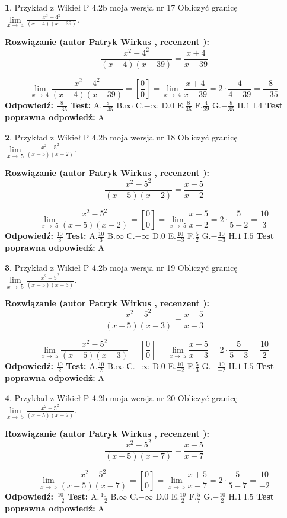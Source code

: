 \documentclass[12pt, a4paper]{article}
\theoremstyle{definition} %
\newtheorem{zad}{}
\newcommand{\zadStart}[1]{\begin{zad}#1\newline}
\newcommand{\zadStop}{\end{zad}}
\newcommand{\rozwStart}[2]{\noindent \textbf{Rozwiązanie (autor #1 , recenzent #2): }\newline}
\newcommand{\rozwStop}{\newline}
\newcommand{\odpStart}{\noindent \textbf{Odpowiedź:}\newline}
\newcommand{\odpStop}{\newline}
\newcommand{\testStart}{\noindent \textbf{Test:}\newline}
\newcommand{\testStop}{\newline}
\newcommand{\kluczStart}{\noindent \textbf{Test poprawna odpowiedź:}\newline}
\newcommand{\kluczStop}{\newline}
\begin{document}
\zadStart{Przykład z Wikieł P 4.2b moja wersja nr 17}
Obliczyć granicę $\lim\limits_{x\to\ 4}\frac{x^{2}-4^{2}}{(x-4)(x-39)}$.
\zadStop
\rozwStart{Patryk Wirkus}{}
$$\frac{x^{2}-4^{2}}{(x-4)(x-39)}=\frac{x+4}{x-39}$$

$$\lim\limits_{x\to\ 4}\frac{x^{2}-4^{2}}{(x-4)(x-39)}=[\frac{0}{0}]=\lim\limits_{x\to\ 4}\frac{x+4}{x-39}=2 \cdot \frac{4}{4-39} = \frac{8}{-35}$$
\rozwStop
\odpStart
$\frac{8}{-35}$
\odpStop
\testStart
A.$\frac{8}{-35}$
B.$\infty$
C.$-\infty$
D.$0$
E.$\frac{8}{35}$
F.$\frac{4}{39}$
G.$-\frac{8}{35}$
H.$1$
I.$4$
\testStop
\kluczStart
A
\kluczStop



\zadStart{Przykład z Wikieł P 4.2b moja wersja nr 18}
Obliczyć granicę $\lim\limits_{x\to\ 5}\frac{x^{2}-5^{2}}{(x-5)(x-2)}$.
\zadStop
\rozwStart{Patryk Wirkus}{}
$$\frac{x^{2}-5^{2}}{(x-5)(x-2)}=\frac{x+5}{x-2}$$

$$\lim\limits_{x\to\ 5}\frac{x^{2}-5^{2}}{(x-5)(x-2)}=[\frac{0}{0}]=\lim\limits_{x\to\ 5}\frac{x+5}{x-2}=2 \cdot \frac{5}{5-2} = \frac{10}{3}$$
\rozwStop
\odpStart
$\frac{10}{3}$
\odpStop
\testStart
A.$\frac{10}{3}$
B.$\infty$
C.$-\infty$
D.$0$
E.$\frac{10}{-3}$
F.$\frac{5}{2}$
G.$-\frac{10}{-3}$
H.$1$
I.$5$
\testStop
\kluczStart
A
\kluczStop



\zadStart{Przykład z Wikieł P 4.2b moja wersja nr 19}
Obliczyć granicę $\lim\limits_{x\to\ 5}\frac{x^{2}-5^{2}}{(x-5)(x-3)}$.
\zadStop
\rozwStart{Patryk Wirkus}{}
$$\frac{x^{2}-5^{2}}{(x-5)(x-3)}=\frac{x+5}{x-3}$$

$$\lim\limits_{x\to\ 5}\frac{x^{2}-5^{2}}{(x-5)(x-3)}=[\frac{0}{0}]=\lim\limits_{x\to\ 5}\frac{x+5}{x-3}=2 \cdot \frac{5}{5-3} = \frac{10}{2}$$
\rozwStop
\odpStart
$\frac{10}{2}$
\odpStop
\testStart
A.$\frac{10}{2}$
B.$\infty$
C.$-\infty$
D.$0$
E.$\frac{10}{-2}$
F.$\frac{5}{3}$
G.$-\frac{10}{-2}$
H.$1$
I.$5$
\testStop
\kluczStart
A
\kluczStop



\zadStart{Przykład z Wikieł P 4.2b moja wersja nr 20}
Obliczyć granicę $\lim\limits_{x\to\ 5}\frac{x^{2}-5^{2}}{(x-5)(x-7)}$.
\zadStop
\rozwStart{Patryk Wirkus}{}
$$\frac{x^{2}-5^{2}}{(x-5)(x-7)}=\frac{x+5}{x-7}$$

$$\lim\limits_{x\to\ 5}\frac{x^{2}-5^{2}}{(x-5)(x-7)}=[\frac{0}{0}]=\lim\limits_{x\to\ 5}\frac{x+5}{x-7}=2 \cdot \frac{5}{5-7} = \frac{10}{-2}$$
\rozwStop
\odpStart
$\frac{10}{-2}$
\odpStop
\testStart
A.$\frac{10}{-2}$
B.$\infty$
C.$-\infty$
D.$0$
E.$\frac{10}{2}$
F.$\frac{5}{7}$
G.$-\frac{10}{2}$
H.$1$
I.$5$
\testStop
\kluczStart
A
\kluczStop
\end{document}
